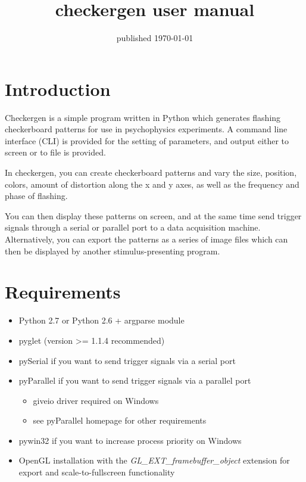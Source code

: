 \documentclass[12pt,titlepage]{article}
\newenvironment{compactemize}
{\begin{itemize}
  \setlength{\itemsep}{1.5pt}
  \setlength{\parskip}{0pt}
  \setlength{\parsep}{0pt}}
{\end{itemize}}
\begin{document}
\title{\textbf{checkergen user manual}}
\author{}
\date{published \today}

\maketitle

\tableofcontents
\pagebreak

\onehalfspacing

\section{Introduction}

Checkergen is a simple program written in Python which generates
flashing checkerboard patterns for use in psychophysics experiments. A
command line interface (CLI) is provided for the setting of
parameters, and output either to screen or to file is provided.

In checkergen, you can create checkerboard patterns and vary the
size, position, colors, amount of distortion along the x and y axes,
as well as the frequency and phase of flashing.

You can then display these patterns on screen, and at the same time
send trigger signals through a serial or parallel port to a data
acquisition machine. Alternatively, you can export the patterns as a
series of image files which can then be displayed by another
stimulus-presenting program.

\section{Requirements}

\begin{compactemize}
\item Python 2.7 or Python 2.6 + argparse module
\item pyglet (version >= 1.1.4 recommended)
\item pySerial if you want to send trigger signals via a serial port
\item pyParallel if you want to send trigger signals via a parallel port
\begin{compactemize}
\item giveio driver required on Windows
\item see pyParallel homepage for other requirements
\end{compactemize}
\item pywin32 if you want to increase process priority on Windows
\item OpenGL installation with the \emph{GL\_EXT\_framebuffer\_object}
  extension for export and scale-to-fullscreen functionality
\end{compactemize}
\end{document}
